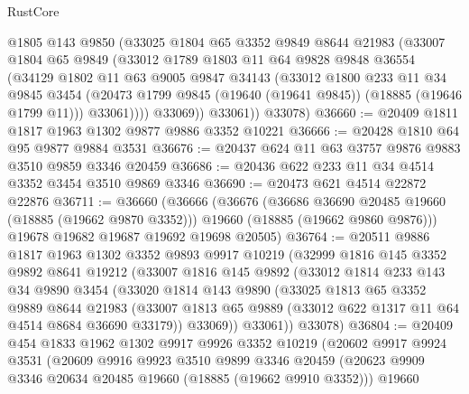 \begin{lexlean}{RustCore}
\begin{coremodule}
            @1805
            @143
            @9850
            (@33025
              @1804
              @65
              @3352
              @9849
              @8644
              @21983
              (@33007
                @1804
                @65
                @9849
                (@33012
                  @1789
                  @1803
                  @11
                  @64
                  @9828
                  @9848
                  @36554
                  (@34129
                    @1802
                    @11
                    @63
                    @9005
                    @9847
                    @34143
                    (@33012
                      @1800
                      @233
                      @11
                      @34
                      @9845
                      @3454
                      (@20473 @1799 @9845 (@19640 (@19641 @9845)) (@18885 (@19646 @1799 @11)))
                      @33061))))
              @33069))
          @33061))
      @33078)
@36660 := @20409 @1811 @1817 @1963 @1302 @9877 @9886 @3352 @10221
@36666 := @20428 @1810 @64 @95 @9877 @9884 @3531
@36676 := @20437 @624 @11 @63 @3757 @9876 @9883 @3510 @9859 @3346 @20459
@36686 := @20436 @622 @233 @11 @34 @4514 @3352 @3454 @3510 @9869 @3346
@36690 := @20473 @621 @4514 @22872 @22876
@36711 := @36660
    (@36666
      (@36676
        (@36686 @36690 @20485 @19660 (@18885 (@19662 @9870 @3352)))
        @19660
        (@18885 (@19662 @9860 @9876)))
      @19678
      @19682
      @19687
      @19692
      @19698
      @20505)
@36764 := @20511
    @9886
    @1817
    @1963
    @1302
    @3352
    @9893
    @9917
    @10219
    (@32999
      @1816
      @145
      @3352
      @9892
      @8641
      @19212
      (@33007
        @1816
        @145
        @9892
        (@33012
          @1814
          @233
          @143
          @34
          @9890
          @3454
          (@33020
            @1814
            @143
            @9890
            (@33025
              @1813
              @65
              @3352
              @9889
              @8644
              @21983
              (@33007 @1813 @65 @9889 (@33012 @622 @1317 @11 @64 @4514 @8684 @36690 @33179))
              @33069))
          @33061))
      @33078)
@36804 := @20409
    @454
    @1833
    @1962
    @1302
    @9917
    @9926
    @3352
    @10219
    (@20602
      @9917
      @9924
      @3531
      (@20609
        @9916
        @9923
        @3510
        @9899
        @3346
        @20459
        (@20623 @9909 @3346 @20634 @20485 @19660 (@18885 (@19662 @9910 @3352)))
        @19660

\end{coremodule}
\end{lexlean}
